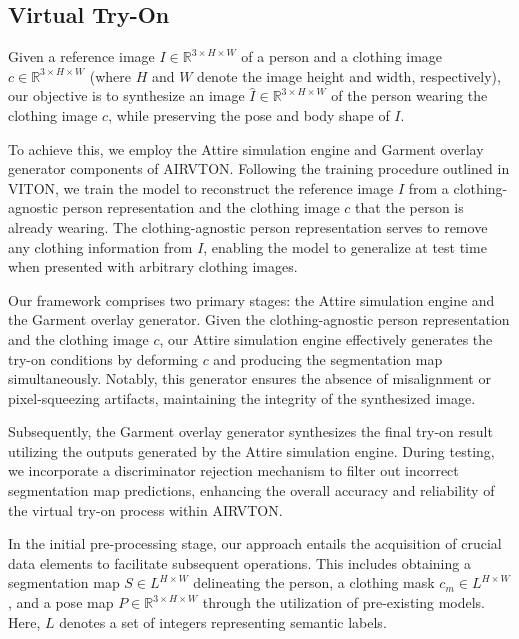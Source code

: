 \subsection{Virtual Try-On}
    Given a reference image \( I \in \mathbb{R}^{3 \times H \times W} \) of a person and a clothing image \( c \in \mathbb{R}^{3 \times H \times W} \) (where \( H \) and \( W \) denote the image height and width, respectively), our objective is to synthesize an image \( \hat{I} \in \mathbb{R}^{3 \times H \times W} \) of the person wearing the clothing image \( c \), while preserving the pose and body shape of \( I \).

    To achieve this, we employ the Attire simulation engine and Garment overlay generator components of AIRVTON. Following the training procedure outlined in VITON, we train the model to reconstruct the reference image \( I \) from a clothing-agnostic person representation and the clothing image \( c \) that the person is already wearing. The clothing-agnostic person representation serves to remove any clothing information from \( I \), enabling the model to generalize at test time when presented with arbitrary clothing images.

    Our framework comprises two primary stages: the Attire simulation engine and the Garment overlay generator. Given the clothing-agnostic person representation and the clothing image \( c \), our Attire simulation engine effectively generates the try-on conditions by deforming \( c \) and producing the segmentation map simultaneously. Notably, this generator ensures the absence of misalignment or pixel-squeezing artifacts, maintaining the integrity of the synthesized image.

    Subsequently, the Garment overlay generator synthesizes the final try-on result utilizing the outputs generated by the Attire simulation engine. During testing, we incorporate a discriminator rejection mechanism to filter out incorrect segmentation map predictions, enhancing the overall accuracy and reliability of the virtual try-on process within AIRVTON.

    In the initial pre-processing stage, our approach entails the acquisition of crucial data elements to facilitate subsequent operations. This includes obtaining a segmentation map \( S \in L^{H \times W} \) delineating the person, a clothing mask \( c_m \in L^{H \times W} \), and a pose map \( P \in \mathbb{R}^{3 \times H \times W} \) through the utilization of pre-existing models. Here, \( L \) denotes a set of integers representing semantic labels.

